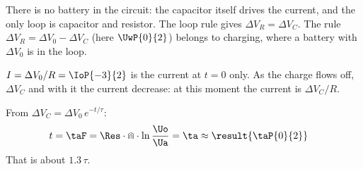 \begin{abcliste}
\abc There is no battery in the circuit: the capacitor itself drives the current, and the only loop is capacitor and resistor. The loop rule gives $\Delta V_R = \Delta V_C$. The rule $\Delta V_R = \Delta V_0 - \Delta V_C$ (here $\UwP{0}{2}$) belongs to charging, where a battery with $\Delta V_0$ is in the loop.

$I = \Delta V_0/R = \IoP{-3}{2}$ is the current at $t = 0$ only. As the charge flows off, $\Delta V_C$ and with it the current decrease: at this moment the current is $\Delta V_C/R$.

\abc From $\Delta V_C = \Delta V_0\,e^{-t/\tau}$:
\begin{align}
 t &= \taF = \Res\cdot\Cap\cdot\ln\frac{\Uo}{\Ua} = \ta \approx \result{\taP{0}{2}}
\end{align}
That is about $1.3\,\tau$.
\end{abcliste}

